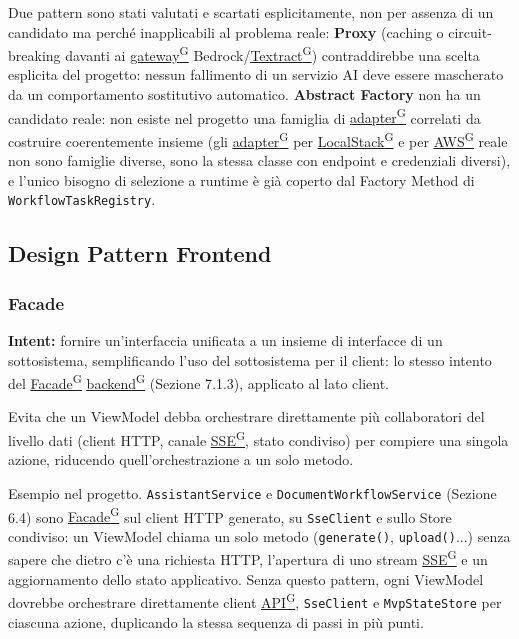 \documentclass[a4paper,12pt]{article}
\providecommand{\glslink}[2]{\href{https://alittlebyte-19.github.io/Documentazione/glossario.html\#gls-#1}{\underline{#2}\textsuperscript{\scriptsize G}}}
\begin{document}
\begin{sloppypar}
Due pattern sono stati valutati e scartati esplicitamente, non per assenza di un candidato ma perché inapplicabili al problema reale: \textbf{Proxy} (caching o circuit-breaking davanti ai \glslink{gateway}{gateway} Bedrock/\glslink{textract}{Textract}) contraddirebbe una scelta esplicita del progetto: nessun fallimento di un servizio AI deve essere mascherato da un comportamento sostitutivo automatico. \textbf{Abstract Factory} non ha un candidato reale: non esiste nel progetto una famiglia di \glslink{adapter}{adapter} correlati da costruire coerentemente insieme (gli \glslink{adapter}{adapter} per \glslink{localstack}{LocalStack} e per \glslink{aws}{AWS} reale non sono famiglie diverse, sono la stessa classe con endpoint e credenziali diversi), e l'unico bisogno di selezione a runtime è già coperto dal Factory Method di \texttt{WorkflowTaskRegistry}.

\subsection{Design Pattern Frontend}

\subsubsection{Facade}

\textbf{Intent:} fornire un'interfaccia unificata a un insieme di interfacce di un sottosistema, semplificando l'uso del sottosistema per il client: lo stesso intento del \glslink{facade}{Facade} \glslink{backend}{backend} (Sezione 7.1.3), applicato al lato client.

Evita che un ViewModel debba orchestrare direttamente più collaboratori del livello dati (client HTTP, canale \glslink{sse-server-sent-events}{SSE}, stato condiviso) per compiere una singola azione, riducendo quell'orchestrazione a un solo metodo.

Esempio nel progetto. \texttt{AssistantService} e \texttt{DocumentWorkflowService} (Sezione 6.4) sono \glslink{facade}{Facade} sul client HTTP generato, su \texttt{SseClient} e sullo Store condiviso: un ViewModel chiama un solo metodo (\texttt{generate()}, \texttt{upload()}...) senza sapere che dietro c'è una richiesta HTTP, l'apertura di uno stream \glslink{sse-server-sent-events}{SSE} e un aggiornamento dello stato applicativo. Senza questo pattern, ogni ViewModel dovrebbe orchestrare direttamente client \glslink{api-application-programming-interface}{API}, \texttt{SseClient} e \texttt{MvpStateStore} per ciascuna azione, duplicando la stessa sequenza di passi in più punti.


\end{sloppypar}
\end{document}
